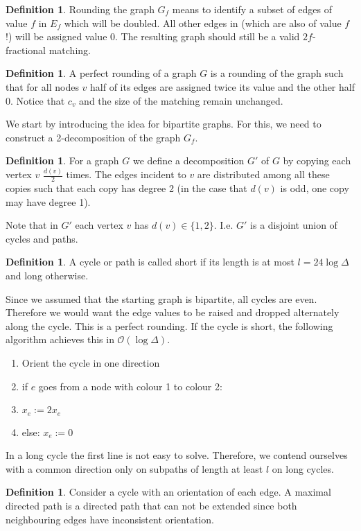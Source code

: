 \documentclass[a4paper, 12pt]{article}
\theoremstyle{plain}
\theoremstyle{definition}
\newtheorem{definition}[theorem]{Definition} %
\theoremstyle{lemma}
\theoremstyle{remark}
\theoremstyle{corollary}
\theoremstyle{example}
\begin{document}
	\begin{definition}
		Rounding the graph $G_f$ means to identify a subset of edges of value $f$ in $E_f$ which will be doubled. All other edges in (which are also of value $f$!) will be assigned value 0. The resulting graph should still be a valid $2f$-fractional matching.
	\end{definition}
	\begin{definition}
		A perfect rounding of a graph $G$ is a rounding of the graph such that for all nodes $v$ half of its edges are assigned twice its value and the other half 0. Notice that $c_v$ and the size of the matching remain unchanged.
	\end{definition}
	We start by introducing the idea for bipartite graphs. For this, we need to construct a 2-decomposition of the graph $G_f$.
	\begin{definition}
		For a graph $G$ we define a decomposition $G'$ of $G$ by copying each vertex $v$ $\frac{d(v)}{2}$ times. The edges incident to $v$ are distributed among all these copies such that each copy has degree 2 (in the case that $d(v)$ is odd, one copy may have degree 1).
	\end{definition}
	Note that in $G'$ each vertex $v$ has $d(v) \in \{1,2\}$. I.e. $G'$ is a disjoint union of cycles and paths.
	\begin{definition}
		A cycle or path is called short if its length is at most $l = 24\log \Delta$ and long otherwise.
	\end{definition}
	Since we assumed that the starting graph is bipartite, all cycles are even. Therefore we would want the edge values to be raised and dropped alternately along the cycle. This is a perfect rounding. If the cycle is short, the following algorithm achieves this in $\mathcal{O}(\log \Delta)$.
	\begin{enumerate}
		\item Orient the cycle in one direction
		\item if $e$ goes from a node with colour 1 to colour 2:
		\item $x_e := 2x_e$
		\item else: $x_e := 0$
	\end{enumerate}
	In a long cycle the first line is not easy to solve. Therefore, we contend ourselves with a common direction only on subpaths of length at least $l$ on long cycles.
	\begin{definition}
		Consider a cycle with an orientation of each edge. A maximal directed path is a directed path that can not be extended since both neighbouring edges have inconsistent orientation.
	\end{definition}
\end{document}
